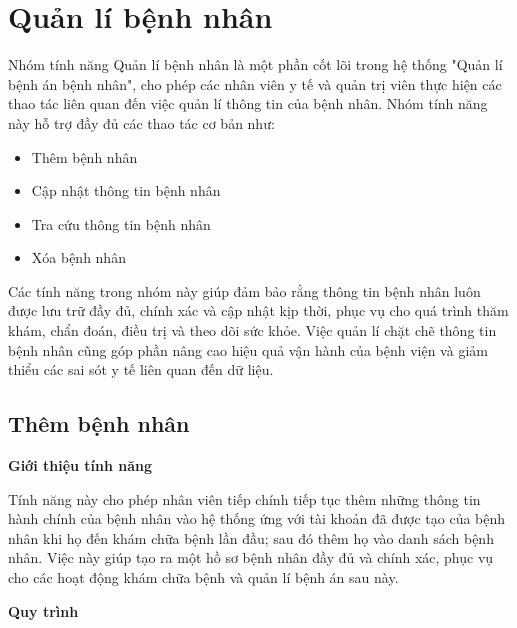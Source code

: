 \section{Quản lí bệnh nhân}

Nhóm tính năng Quản lí bệnh nhân là một phần cốt lõi trong hệ thống "Quản lí bệnh án bệnh nhân", cho phép các nhân viên y tế và quản trị viên thực hiện các thao tác liên quan đến việc quản lí thông tin của bệnh nhân. Nhóm tính năng này hỗ trợ đầy đủ các thao tác cơ bản như:
\begin{itemize}
    \item Thêm bệnh nhân
    \item Cập nhật thông tin bệnh nhân
    \item Tra cứu thông tin bệnh nhân
    \item Xóa bệnh nhân
\end{itemize}

Các tính năng trong nhóm này giúp đảm bảo rằng thông tin bệnh nhân luôn được lưu trữ đầy đủ, chính xác và cập nhật kịp thời, phục vụ cho quá trình thăm khám, chẩn đoán, điều trị và theo dõi sức khỏe. Việc quản lí chặt chẽ thông tin bệnh nhân cũng góp phần nâng cao hiệu quả vận hành của bệnh viện và giảm thiểu các sai sót y tế liên quan đến dữ liệu.

\subsection{Thêm bệnh nhân}

\noindent \textbf{Giới thiệu tính năng}

Tính năng này cho phép nhân viên tiếp chính tiếp tục thêm những thông tin hành chính của bệnh nhân vào hệ thống ứng với tài khoản đã được tạo của bệnh nhân khi họ đến khám chữa bệnh lần đầu; sau đó thêm họ vào danh sách bệnh nhân. Việc này giúp tạo ra một hồ sơ bệnh nhân đầy đủ và chính xác, phục vụ cho các hoạt động khám chữa bệnh và quản lí bệnh án sau này. 

\noindent \textbf{Quy trình}

